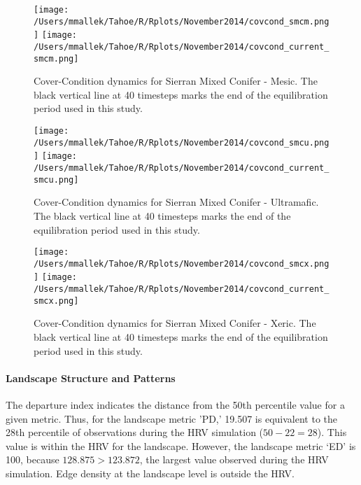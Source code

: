 \clearpage

\begin{figure}
\texttt{[image: /Users/mmallek/Tahoe/R/Rplots/November2014/covcond\_smcm.png]}
\texttt{[image: /Users/mmallek/Tahoe/R/Rplots/November2014/covcond\_current\_smcm.png]}
\caption{Cover-Condition dynamics for Sierran Mixed Conifer - Mesic. The black vertical line at 40 timesteps marks the end of the equilibration period used in this study.} 
\label{covcond_smcm}
\end{figure}

\begin{figure}
\texttt{[image: /Users/mmallek/Tahoe/R/Rplots/November2014/covcond\_smcu.png]}
\texttt{[image: /Users/mmallek/Tahoe/R/Rplots/November2014/covcond\_current\_smcu.png]}
\caption{Cover-Condition dynamics for Sierran Mixed Conifer - Ultramafic. The black vertical line at 40 timesteps marks the end of the equilibration period used in this study.} 
\label{covcond_smcu}
\end{figure}

\begin{figure}
\texttt{[image: /Users/mmallek/Tahoe/R/Rplots/November2014/covcond\_smcx.png]}
\texttt{[image: /Users/mmallek/Tahoe/R/Rplots/November2014/covcond\_current\_smcx.png]}
\caption{Cover-Condition dynamics for Sierran Mixed Conifer - Xeric. The black vertical line at 40 timesteps marks the end of the equilibration period used in this study.} 
\label{covcond_smcx}
\end{figure}

\clearpage

\paragraph{Landscape Structure and Patterns}

The departure index indicates the distance from the 50th percentile value for a given metric. Thus, for the landscape metric 'PD,' 19.507 is equivalent to the 28th percentile of observations during the HRV simulation ($50-22 = 28$). This value is within the HRV for the landscape. However, the landscape metric `ED' is 100, because $128.875 > 123.872$, the largest value observed during the HRV simulation. Edge density at the landscape level is outside the HRV.


